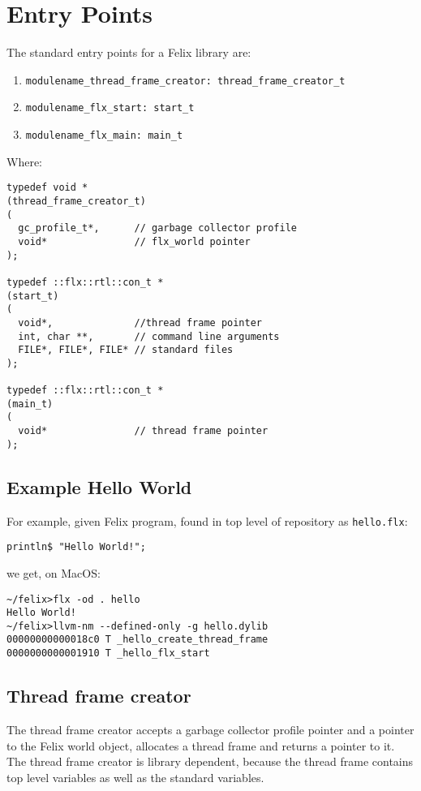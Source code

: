 \documentclass[oneside]{book}
\begin{document}
\section{Entry Points}
The standard entry points for a Felix library are:

\begin{enumerate}
\item \verb$modulename_thread_frame_creator: thread_frame_creator_t$
\item \verb$modulename_flx_start: start_t$
\item \verb$modulename_flx_main: main_t$
\end{enumerate}

Where:

\begin{verbatim}
typedef void *
(thread_frame_creator_t)
(
  gc_profile_t*,      // garbage collector profile
  void*               // flx_world pointer
);

typedef ::flx::rtl::con_t *
(start_t)
(
  void*,              //thread frame pointer 
  int, char **,       // command line arguments
  FILE*, FILE*, FILE* // standard files 
);

typedef ::flx::rtl::con_t *
(main_t)
(
  void*               // thread frame pointer
);
\end{verbatim}

\subsection{Example Hello World}
For example, given Felix program, found in top level of repository as \verb$hello.flx$:
\begin{verbatim}
println$ "Hello World!";
\end{verbatim}

we get, on MacOS:

\begin{verbatim}
~/felix>flx -od . hello
Hello World!
~/felix>llvm-nm --defined-only -g hello.dylib
00000000000018c0 T _hello_create_thread_frame
0000000000001910 T _hello_flx_start
\end{verbatim}

\subsection{Thread frame creator}
The thread frame creator accepts a garbage collector profile
pointer and a pointer to the Felix world object, allocates
a thread frame and returns a pointer to it. The thread
frame creator is library dependent, because the thread frame
contains top level variables as well as the standard variables.
\end{document}
